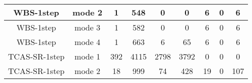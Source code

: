 \begin{table}[]
\begin{tabular}{@{}ccccccccc@{}}
        WBS-1step                                                   & mode 2                                                       & 1                                                          & 548                                                          & 0                                                              & 0                                                                      & 6                                                             & 0                                                                      & 6        \\ \midrule
        WBS-1step                                                   & mode 3                                                       & 1                                                          & 582                                                          & 0                                                              & 0                                                                      & 6                                                             & 0                                                                      & 6        \\ \midrule
        WBS-1step                                                   & mode 4                                                       & 1                                                          & 663                                                          & 6                                                              & 65                                                                     & 6                                                             & 0                                                                      & 6        \\ \midrule
        TCAS-SR-1step                                               & mode 1                                                       & 392                                                        & 4115                                                         & 2798                                                           & 3792                                                                   & 0                                                             & 0                                                                      & 0        \\ \midrule
        TCAS-SR-1step                                               & mode 2                                                       & 18                                                         & 999                                                          & 74                                                             & 428                                                                    & 19                                                            & 0                                                                      & 107      \\ \midrule

\end{tabular}
\end{table}
